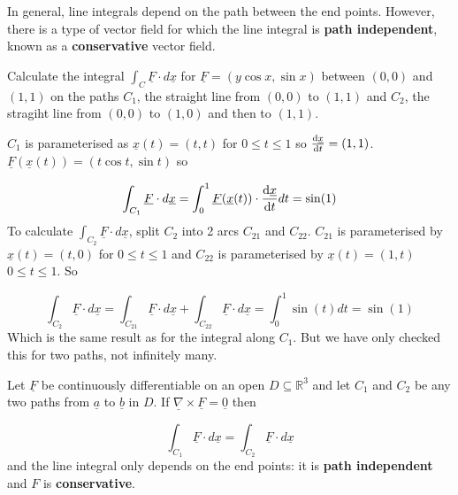 In general, line integrals depend on the path between the end points. However, there is a type of vector field for which the line integral is \textbf{path independent}, known as a \textbf{conservative} vector field.

\begin{example}
	Calculate the integral $\int_C \underline{F} \cdot d\underline{x}$ for $\underline{F} = (y \cos x, \sin x)$ between $(0, 0)$ and $(1, 1)$ on the paths $C_1$, the straight line from $(0, 0)$ to $(1, 1)$ and $C_2$, the stragiht line from $(0, 0)$ to $(1, 0)$ and then to $(1, 1)$.

	$C_1$ is parameterised as $\underline{x}(t) = (t, t)$ for $0 \le t \le 1$ so $\diff{\underline{x}}{t} = (1, 1)$. $\underline{F}(\underline{x}(t)) = (t \cos t, \sin t)$ so

	\[ \int_{C_1} \underline{F} \cdot d \underline{x} = \int_0^1 \underline{F}(\underline{x}(t)) \cdot \diff{\underline{x}}{t} dt = \sin(1) \]
	To calculate $\int_{C_2} \underline{F} \cdot d \underline{x}$, split $C_2$ into 2 arcs $C_{21}$ and $C_{22}$. $C_{21}$ is parameterised by $\underline{x}(t) = (t, 0)$ for $0 \le t \le 1$ and $C_{22}$ is parameterised by $\underline{x}(t) = (1, t)$ $0 \le t \le 1$. So

	\[ \int_{C_2} \underline{F} \cdot d \underline{x} = \int_{C_{21}} \underline{F} \cdot d \underline{x} + \int_{C_{22}} \underline{F} \cdot d \underline{x} = \int_0^1 \sin(t) dt = \sin(1) \]
	Which is the same result as for the integral along $C_1$. But we have only checked this for two paths, not infinitely many.
\end{example}

\begin{theorem}
	Let $\underline{F}$ be continuously differentiable on an open $D \subseteq \mathbb{R}^3$ and let $C_1$ and $C_2$ be any two paths from $\underline{a}$ to $\underline{b}$ in $D$. If $\underline{\nabla} \times \underline{F} = \underline{0}$ then
	
	\[ \int_{C_1} \underline{F} \cdot d\underline{x} = \int_{C_2} \underline{F} \cdot d\underline{x} \]
	and the line integral only depends on the end points: it is \textbf{path independent} and $F$ is \textbf{conservative}.
\end{theorem}
	

